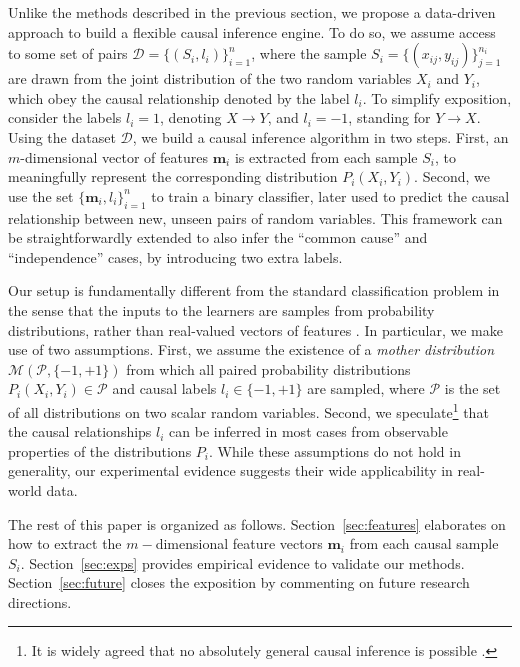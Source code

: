 \documentclass[twoside,11pt,a4paper]{article}
\begin{document}
Unlike the methods described in the previous section, we propose a data-driven
approach to build a flexible causal inference engine.  To do so, we assume
access to some set of pairs $\mathcal{D} =\{(S_i,l_i)\}_{i=1}^n$, where the
sample $S_i =\{(x_{ij},y_{ij})\}_{j=1}^{n_i}$ are drawn from the joint
distribution of the two random variables $X_i$ and $Y_i$, which obey the causal
relationship denoted by the label $l_i$.  To simplify exposition,
consider the labels $l_i = 1$, denoting $X \rightarrow Y$, and $l_i = -1$,
standing for $Y \rightarrow X$.  Using the dataset $\mathcal{D}$, we build a
causal inference algorithm in two steps.  First, an $m$-dimensional vector of
features $\bm m_i$ is extracted from each sample $S_i$, to meaningfully
represent the corresponding distribution $P_i(X_i,Y_i)$. Second, we use the set
$\{\bm m_i, l_i\}_{i=1}^{n}$ to train a binary classifier, later used to
predict the causal relationship between new, unseen pairs of random variables.
This framework can be straightforwardly extended to also infer the ``common
cause'' and ``independence'' cases, by introducing two extra labels. 

Our setup is fundamentally different from the standard classification problem
in the sense that the inputs to the learners are samples from probability
distributions, rather than real-valued vectors of features
\citep{Muandet12:SMM,Szabo14}.  In particular, we make use of two assumptions.
First, we assume the existence of a \emph{mother distribution}
$\mathcal{M}(\mathcal{P},\{-1,+1\})$ from which all paired probability
distributions $P_i(X_i,Y_i) \in \mathcal{P}$ and causal labels $l_i \in
\{-1,+1\}$ are sampled, where $\mathcal{P}$ is the set of all distributions on
two scalar random variables. Second, we speculate\footnote{It is widely agreed
that no absolutely general causal inference is possible
\citep{Cartwright94:Nature}.} that the causal relationships $l_i$ can be
inferred in most cases from observable properties of the distributions $P_i$.
While these assumptions do not hold in generality, our experimental evidence
suggests their wide applicability in real-world data.

The rest of this paper is organized as follows.  Section~\ref{sec:features}
elaborates on how to extract the $m-$dimensional feature vectors $\bm m_i$ from
each causal sample $S_i$.  Section~\ref{sec:exps} provides empirical evidence
to validate our methods. Section~\ref{sec:future} closes the
exposition by commenting on future research directions. 
\end{document}

